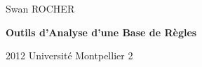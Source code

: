
{\setlength{\parindent}{0cm}
Swan ROCHER
}
\vfill
{\centering \Huge \bfseries Outils d'Analyse d'une Base de Règles\par}
\vfill
2012 \hfill Université Montpellier 2
\newpage
 

